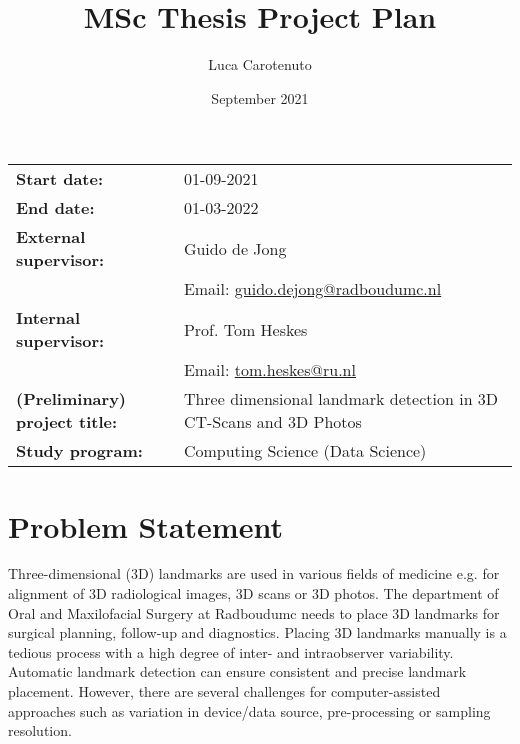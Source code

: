 \documentclass{article}
\title{MSc Thesis Project Plan}
\author{Luca Carotenuto}
\date{September 2021}
\begin{document}
\maketitle


\begin{table}[h]
\begin{tabularx}{\textwidth}{lL}
\textbf{Start date:}                  & 01-09-2021                       \\
\textbf{End date:}                    & 01-03-2022                       \\
\textbf{External supervisor:}                  & Guido de Jong\\ & Email: \href{mailto:guido.dejong@radboudumc.nl}{guido.dejong@radboudumc.nl}                           \\
\textbf{Internal supervisor:}                  & Prof. Tom Heskes\\ &  Email: \href{tom.heskes@ru.nl}{tom.heskes@ru.nl}                                 \\
\textbf{(Preliminary) project title:} & Three dimensional landmark detection in 3D CT-Scans and 3D Photos                             \\
\textbf{Study program:}               & Computing Science (Data Science)
\end{tabularx}
\end{table}
 
\section{Problem Statement}
Three-dimensional (3D) landmarks are used in various fields of medicine e.g. for alignment of 3D radiological images, 3D scans or 3D photos. The department of Oral and Maxilofacial Surgery at Radboudumc needs to place 3D landmarks for surgical planning, follow-up and diagnostics. Placing 3D landmarks manually is a tedious process with a high degree of inter- and intraobserver variability. Automatic landmark detection can ensure consistent and precise landmark placement. However, there are several challenges for computer-assisted approaches such as variation in device/data source, pre-processing or sampling resolution. 
\end{document}
